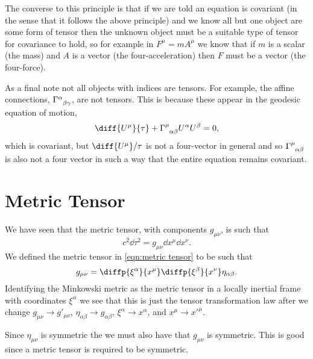 \documentclass[fleqn]{NotesClass}
\newcommand*{\christoffel}[3]{\tensor{\Gamma}{^{#1}_{{#2}{#3}}}}
\begin{document}
    The converse to this principle is that if we are told an equation is covariant (in the sense that it follows the above principle) and we know all but one object are some form of tensor then the unknown object must be a suitable type of tensor for covariance to hold, so for example in \(F^\mu = m A^\mu\) we know that if \(m\) is a scalar (the mass) and \(A\) is a vector (the four-acceleration) then \(F\) must be a vector (the four-force).
    
    As a final note not all objects with indices are tensors.
    For example, the affine connections, \(\christoffel{\alpha}{\beta}{\gamma}\), are not tensors.
    This is because these appear in the geodesic equation of motion,
    \begin{equation}
        \diff{U^\mu}{\tau} + \christoffel{\mu}{\alpha}{\beta} U^\alpha U^\beta = 0,
    \end{equation}
    which is covariant, but \(\diff{U^\mu}/{\tau}\) is not a four-vector in general and so \(\christoffel{\mu}{\alpha}{\beta}\) is also not a four vector in such a way that the entire equation remains covariant.
    
    \section{Metric Tensor}
    We have seen that the metric tensor, with components \(g_{\mu\nu}\), is such that
    \begin{equation}
        c^2 \dd{\tau^2} = g_{\mu\nu} \dd{x^\mu} \dd{x^\nu}.
    \end{equation}
    We defined the metric tensor in \cref{eqn:metric tensor} to be such that
    \begin{equation}
        g_{\mu\nu} = \diffp{\xi^\alpha}{x^\mu} \diffp{\xi^\beta}{x^\nu} \eta_{\alpha\beta}.
    \end{equation}
    Identifying the Minkowski metric as the metric tensor in a locally inertial frame with coordinates \(\xi^\alpha\) we see that this is just the tensor transformation law after we change \(g_{\mu\nu} \to g'_{\mu\nu}\), \(\eta_{\alpha\beta} \to g_{\alpha\beta}\), \(\xi^\alpha \to x^\alpha\), and \(x^\mu \to x'^\mu\).
    
    Since \(\eta_{\mu\nu}\) is symmetric the we must also have that \(g_{\mu\nu}\) is symmetric.
    This is good since a metric tensor is required to be symmetric.
    
\end{document}
